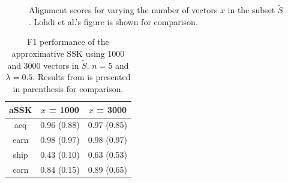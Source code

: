 \begin{figure}[!hbt]
	\centering
	\caption{Alignment scores for varying the number of vectors $ x $ in the subset $ \tilde{S} $. Lohdi et al.'s figure is shown for comparison.\label{fig:alignment}}
\end{figure}

\begin{table}[!hbt]
	\centering
	\begin{tabular}{| c | c | c | }\hline
		aSSK & $ x $ = 1000 & $ x $ = 3000   \\ \hline
		acq & 0.96 (0.88)& 0.97 (0.85)\\ \hline
		earn & 0.98 (0.97) & 0.98  (0.97) \\ \hline
		ship & 0.43 (0.10) & 0.63  (0.53) \\ \hline
		corn & 0.84 (0.15) & 0.89 (0.65) \\ \hline
	\end{tabular} 
	\caption{F1 performance of the approximative SSK using 1000 and 3000 vectors in $ \tilde{S} $. $ n = 5 $ and $ \lambda = 0.5 $. Results from \cite{lodhi} is presented in parenthesis for comparison.\label{tab:alignment}}
\end{table}


